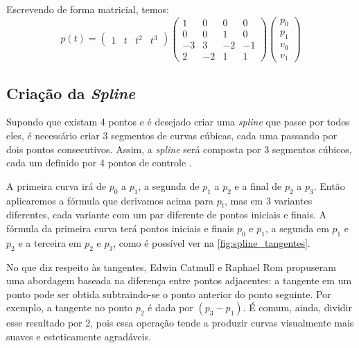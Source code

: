 Escrevendo de forma matricial, temos:
\begin{equation}
    p(t) =  
        \left(
        \begin{array}{rrrr}
            1 & t & t^2 & t^3
        \end{array}\right)
        \left(
        \begin{array}{rrrr}
            1 & 0 & 0 & 0 \\
            0 & 0 & 1 & 0 \\
            -3 & 3 & -2 & -1 \\
                2 & -2 & 1 & 1
        \end{array}\right)
    \left(
        \begin{array}{r}
            p_0 \\
            p_1 \\
            v_0 \\
                v_1
        \end{array}\right)
 \end{equation}

 \subsection{Criação da \textit{Spline}}

 Supondo que existam 4 pontos e é desejado criar uma \textit{spline} que passe por todos eles, é necessário criar 3 segmentos de curvas cúbicas, cada uma passando por dois pontos consecutivos. Assim, a \textit{spline} será composta por 3 segmentos cúbicos, cada um definido por 4 pontos de controle \cite{CatmullRom}.

 A primeira curva irá de $p_0$ a $p_1$, a segunda de $p_1$ a $p_2$ e a final de $p_2$ a $p_3$. Então aplicaremos a fórmula que derivamos acima para $p_t$, mas em 3 variantes diferentes, cada variante com um par diferente de pontos iniciais e finais. A fórmula da primeira curva terá pontos iniciais e finais $p_0$ e $p_1$, a segunda em $p_1$ e $p_2$ e a terceira em $p_2$ e $p_3$, como é possível ver na \autoref{fig:spline_tangentes}. 
 
 No que diz respeito às tangentes, Edwin Catmull e Raphael Rom propuseram uma abordagem baseada na diferença entre pontos adjacentes: a tangente em um ponto pode ser obtida subtraindo-se o ponto anterior do ponto seguinte. Por exemplo, a tangente no ponto $p_2$ é dada por $(p_3 - p_1)$. É comum, ainda, dividir esse resultado por 2, pois essa operação tende a produzir curvas visualmente mais suaves e esteticamente agradáveis.


